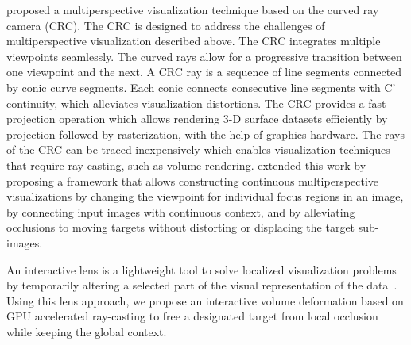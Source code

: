 \cite{5613463} proposed a multiperspective visualization technique
based on the curved ray camera (CRC). The CRC is designed to
address the challenges of multiperspective visualization described
above. The CRC integrates multiple viewpoints seamlessly. The
curved rays allow for a progressive transition between one viewpoint
and the next. A CRC ray is a sequence of line segments connected by
conic curve segments. Each conic connects consecutive line
segments with C'
 continuity, which alleviates visualization
distortions. The CRC provides a fast projection operation which
allows rendering 3-D surface datasets efficiently by projection
followed by rasterization, with the help of graphics hardware. The
rays of the CRC can be traced inexpensively which enables
visualization techniques that require ray casting, such as volume
rendering. \newline
\cite{7120994} extended this work by proposing a framework that allows constructing continuous multiperspective visualizations
by changing the viewpoint for individual focus regions
in an image, by connecting input images with continuous
context, and by alleviating occlusions to moving targets
without distorting or displacing the target sub-images.

An interactive lens is a lightweight tool to solve localized visualization problems by temporarily altering a selected part of the visual representation of the data~\cite{CGF:CGF12871}. Using this lens approach, we propose an interactive volume deformation based on GPU accelerated ray-casting to free a designated target from local occlusion while keeping the global context.

